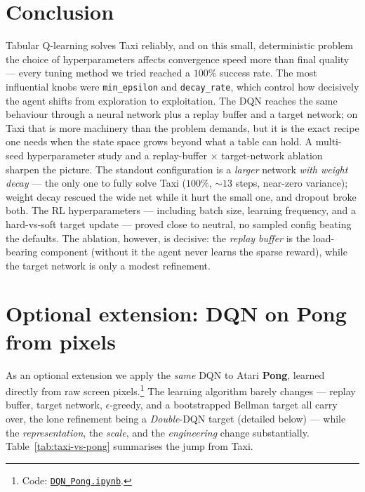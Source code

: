 \documentclass[11pt]{article}
\begin{document}
\section{Conclusion}
Tabular Q-learning solves Taxi reliably, and on this small, deterministic problem the choice of
hyperparameters affects convergence speed more than final quality --- every tuning method we
tried reached a $100\%$ success rate. The most influential knobs were \texttt{min\_epsilon} and
\texttt{decay\_rate}, which control how decisively the agent shifts from exploration to
exploitation. The DQN reaches the same behaviour through a neural network plus a replay buffer
and a target network; on Taxi that is more machinery than the problem demands, but it is the
exact recipe one needs when the state space grows beyond what a table can hold.
A multi-seed hyperparameter study and a replay-buffer $\times$ target-network ablation sharpen the
picture. The standout configuration is a \emph{larger} network \emph{with weight decay} --- the only one to
fully solve Taxi ($100\%$, ${\sim}13$ steps, near-zero variance); weight decay rescued the wide net
while it hurt the small one, and dropout broke both. The RL hyperparameters --- including batch
size, learning frequency, and a hard-vs-soft target update --- proved close to neutral, no sampled
config beating the defaults. The ablation, however, is decisive: the \emph{replay buffer} is the
load-bearing component (without it the agent never learns the sparse reward), while the target
network is only a modest refinement.

\section{Optional extension: DQN on Pong from pixels}
\label{sec:pong}
As an optional extension we apply the \emph{same} DQN to Atari \textbf{Pong}, learned directly from
raw screen pixels.\footnote{Code: \href{https://github.com/asugar13/rl-taxi-pong/blob/main/DQN_Pong.ipynb}{\texttt{DQN\_Pong.ipynb}}.}
The learning algorithm barely changes --- replay buffer, target network, $\epsilon$-greedy, and a
bootstrapped Bellman target all carry over, the lone refinement being a \emph{Double}-DQN target
(detailed below) --- while the \emph{representation}, the \emph{scale}, and the \emph{engineering} change
substantially.
Table~\ref{tab:taxi-vs-pong} summarises the jump from Taxi.
\end{document}

